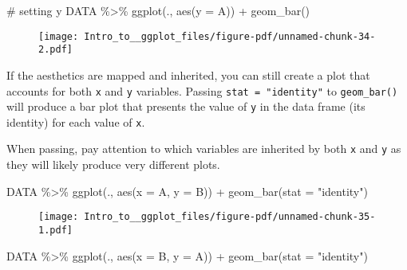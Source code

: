 \documentclass[
  letterpaper,
  DIV=11,
  numbers=noendperiod]{scrartcl}
\newenvironment{Shaded}{\begin{snugshade}}{\end{snugshade}}
\newcommand{\AttributeTok}[1]{\textcolor[rgb]{0.40,0.45,0.13}{#1}}
\newcommand{\CommentTok}[1]{\textcolor[rgb]{0.37,0.37,0.37}{#1}}
\newcommand{\FunctionTok}[1]{\textcolor[rgb]{0.28,0.35,0.67}{#1}}
\newcommand{\NormalTok}[1]{\textcolor[rgb]{0.00,0.23,0.31}{#1}}
\newcommand{\SpecialCharTok}[1]{\textcolor[rgb]{0.37,0.37,0.37}{#1}}
\newcommand{\StringTok}[1]{\textcolor[rgb]{0.13,0.47,0.30}{#1}}
\begin{document}
\begin{Shaded}
\begin{Highlighting}[]
\CommentTok{\# setting y}
\NormalTok{DATA }\SpecialCharTok{\%\textgreater{}\%}
  \FunctionTok{ggplot}\NormalTok{(., }\FunctionTok{aes}\NormalTok{(}\AttributeTok{y =}\NormalTok{ A)) }\SpecialCharTok{+}
  \FunctionTok{geom\_bar}\NormalTok{()}
\end{Highlighting}
\end{Shaded}

\begin{figure}[H]

{\centering \texttt{[image: Intro\_to\_\_ggplot\_files/figure-pdf/unnamed-chunk-34-2.pdf]}

}

\end{figure}

If the aesthetics are mapped and inherited, you can still create a plot
that accounts for both \texttt{x} and \texttt{y} variables. Passing
\texttt{stat\ =\ "identity"} to \texttt{geom\_bar()} will produce a bar
plot that presents the value of \texttt{y} in the data frame (its
identity) for each value of \texttt{x}.

When passing, pay attention to which variables are inherited by both
\texttt{x} and \texttt{y} as they will likely produce very different
plots.

\begin{Shaded}
\begin{Highlighting}[]
\NormalTok{DATA }\SpecialCharTok{\%\textgreater{}\%}
  \FunctionTok{ggplot}\NormalTok{(., }\FunctionTok{aes}\NormalTok{(}\AttributeTok{x =}\NormalTok{ A, }\AttributeTok{y =}\NormalTok{ B)) }\SpecialCharTok{+}
  \FunctionTok{geom\_bar}\NormalTok{(}\AttributeTok{stat =} \StringTok{"identity"}\NormalTok{)}
\end{Highlighting}
\end{Shaded}

\begin{figure}[H]

{\centering \texttt{[image: Intro\_to\_\_ggplot\_files/figure-pdf/unnamed-chunk-35-1.pdf]}

}

\end{figure}

\begin{Shaded}
\begin{Highlighting}[]
\NormalTok{DATA }\SpecialCharTok{\%\textgreater{}\%}
  \FunctionTok{ggplot}\NormalTok{(., }\FunctionTok{aes}\NormalTok{(}\AttributeTok{x =}\NormalTok{ B, }\AttributeTok{y =}\NormalTok{ A)) }\SpecialCharTok{+}
  \FunctionTok{geom\_bar}\NormalTok{(}\AttributeTok{stat =} \StringTok{"identity"}\NormalTok{)}
\end{Highlighting}
\end{Shaded}
\end{document}
